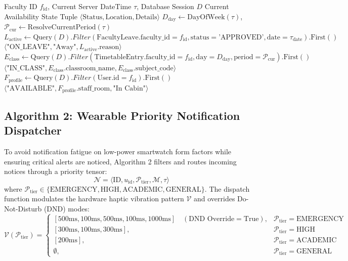 \documentclass[11pt,a4paper]{article}
\begin{document}
\begin{algorithm}[h]
\caption{Hardware-Free Faculty Status Resolution ($O(1)$)}
\label{alg:faculty_status}
\begin{algorithmic}[1]
\Require Faculty ID $f_{\text{id}}$, Current Server DateTime $\tau$, Database Session $D$
\Ensure Current Availability State Tuple $\langle \text{Status}, \text{Location}, \text{Details} \rangle$
\State $D_{\text{day}} \gets \text{DayOfWeek}(\tau)$, $\mathcal{P}_{\text{cur}} \gets \text{ResolveCurrentPeriod}(\tau)$
\State $L_{\text{active}} \gets \text{Query}(D).Filter(\text{FacultyLeave.faculty\_id} = f_{\text{id}}, \text{status} = \text{'APPROVED'}, \text{date} = \tau_{\text{date}}).\text{First}()$
    \State \Return $\langle \text{"ON\_LEAVE"}, \text{"Away"}, L_{\text{active}}.\text{reason} \rangle$
\EndIf
\State $E_{\text{class}} \gets \text{Query}(D).Filter(\text{TimetableEntry.faculty\_id} = f_{\text{id}}, \text{day} = D_{\text{day}}, \text{period} = \mathcal{P}_{\text{cur}}).\text{First}()$
    \State \Return $\langle \text{"IN\_CLASS"}, E_{\text{class}}.\text{classroom\_name}, E_{\text{class}}.\text{subject\_code} \rangle$
\EndIf
\State $F_{\text{profile}} \gets \text{Query}(D).Filter(\text{User.id} = f_{\text{id}}).\text{First}()$
\State \Return $\langle \text{"AVAILABLE"}, F_{\text{profile}}.\text{staff\_room}, \text{"In Cabin"} \rangle$
\end{algorithmic}
\end{algorithm}

\subsection{Algorithm 2: Wearable Priority Notification Dispatcher}
To avoid notification fatigue on low-power smartwatch form factors while ensuring critical alerts are noticed, Algorithm 2 filters and routes incoming notices through a priority tensor:
\begin{equation}
\mathcal{N} = \langle \text{ID}, u_{\text{id}}, \mathcal{P}_{\text{tier}}, \mathcal{M}, \tau \rangle
\end{equation}
where $\mathcal{P}_{\text{tier}} \in \{\text{EMERGENCY}, \text{HIGH}, \text{ACADEMIC}, \text{GENERAL}\}$. The dispatch function modulates the hardware haptic vibration pattern $\mathcal{V}$ and overrides Do-Not-Disturb (DND) modes:
\begin{equation}
\mathcal{V}(\mathcal{P}_{\text{tier}}) = 
\begin{cases} 
[500\text{ms}, 100\text{ms}, 500\text{ms}, 100\text{ms}, 1000\text{ms}] \quad (\text{DND Override} = \text{True}), & \mathcal{P}_{\text{tier}} = \text{EMERGENCY} \\ 
[300\text{ms}, 100\text{ms}, 300\text{ms}], & \mathcal{P}_{\text{tier}} = \text{HIGH} \\ 
[200\text{ms}], & \mathcal{P}_{\text{tier}} = \text{ACADEMIC} \\ 
\emptyset, & \mathcal{P}_{\text{tier}} = \text{GENERAL} 
\end{cases}
\end{equation}
\end{document}
